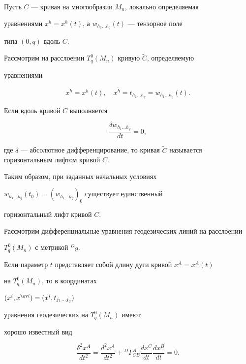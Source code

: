 Пусть $C$ --- кривая на многообразии $M_n$, локально определяемая


уравнениями $x^h=x^h(t)$, а $w_{h_1\dotsc h_q}(t)$ --- тензорное поле


типа $(0,q)$ вдоль $C$.


Рассмотрим на расслоении $T^0_q(M_n)$ кривую $\widetilde C$, определяемую


уравнениями


$$


x^h=x^h(t), \quad x^{\widetilde h}=


t_{h_1\dotsc h_q}=w_{h_1\dotsc h_q}(t).


$$


Если вдоль кривой $C$ выполняется


\begin{equation}


\frac{\delta w_{h_1\dotsc h_q}}{dt}=0,


\end{equation}


где $\delta$ --- абсолютное дифференцирование, то кривая $\widetilde


C$ называется горизонтальным лифтом кривой $C$.


Таким образом, при заданных начальных условиях


$w_{h_1\dotsc h_q}(t_0)=(w_{h_1\dotsc h_q})_0$ существует единственный


горизонтальный лифт кривой $C$.





Рассмотрим дифференциальные уравнения геодезических линий на расслоении


$T^0_q(M_n)$ с метрикой ${}^Dg$.


Если параметр $t$ представляет собой длину дуги кривой $x^A=x^A(t)$


на $T^0_q(M_n)$, то в координатах


$(x^i,x^{\ov i})=(x^i, t_{j_1\dotsc j_q})$


уравнения геодезических на $T^0_q(M_n)$ имеют


хорошо известный вид


\begin{equation}


\frac{\delta^2x^A}{dt^2}=


\frac{d^2x^A}{dt^2}+{}^D\Gamma^A_{CB}\frac{dx^C}{dt}\frac{dx^B}{dt}=0.


\end{equation}





